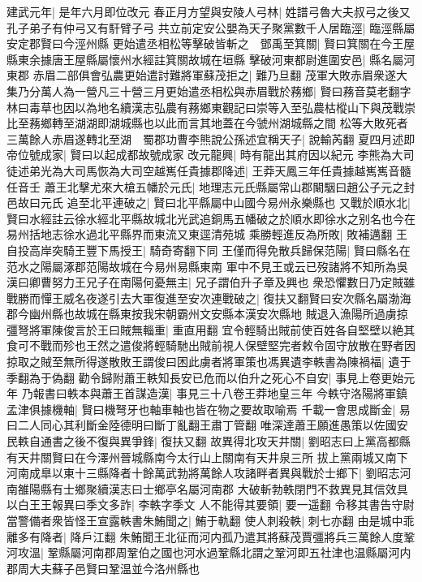 建武元年|{
	是年六月即位改元}
春正月方望與安陵人弓林|{
	姓譜弓魯大夫叔弓之後又孔子弟子有仲弓又有馯臂子弓}
共立前定安公嬰為天子聚黨數千人居臨涇|{
	臨涇縣屬安定郡賢曰今涇州縣}
更始遣丞相松等擊破皆斬之　鄧禹至箕關|{
	賢曰箕關在今王屋縣東余據唐王屋縣屬懷州水經註箕關故城在垣縣}
擊破河東都尉進圍安邑|{
	縣名屬河東郡}
赤眉二部俱會弘農更始遣討難將軍蘇茂拒之|{
	難乃旦翻}
茂軍大敗赤眉衆遂大集乃分萬人為一營凡三十營三月更始遣丞相松與赤眉戰於蓩鄉|{
	賢曰蓩音莫老翻字林曰毒草也因以為地名續漢志弘農有蓩鄉東觀記曰崇等入至弘農枯樅山下與茂戰崇比至蓩鄉轉至湖湖即湖城縣也以此而言其地蓋在今虢州湖城縣之間}
松等大敗死者三萬餘人赤眉遂轉北至湖　蜀郡功曹李熊說公孫述宜稱天子|{
	說輸芮翻}
夏四月述即帝位號成家|{
	賢曰以起成都故號成家}
改元龍興|{
	時有龍出其府因以紀元}
李熊為大司徒述弟光為大司馬恢為大司空越嶲任貴據郡降述|{
	王莽天鳳三年任貴據越嶲嶲音髓任音壬}
蕭王北擊尤來大槍五幡於元氏|{
	地理志元氏縣屬常山郡闞駰曰趙公子元之封邑故曰元氏}
追至北平連破之|{
	賢曰北平縣屬中山國今易州永樂縣也}
又戰於順水北|{
	賢曰水經註云徐水經北平縣故城北光武追銅馬五幡破之於順水即徐水之别名也今在易州括地志徐水過北平縣界而東流又東逕清苑城}
乘勝輕進反為所敗|{
	敗補邁翻}
王自投高岸突騎王豐下馬授王|{
	騎奇寄翻下同}
王僅而得免散兵歸保范陽|{
	賢曰縣名在范水之陽屬涿郡范陽故城在今易州易縣東南}
軍中不見王或云已歿諸將不知所為吳漢曰卿曹努力王兄子在南陽何憂無主|{
	兄子謂伯升子章及興也}
衆恐懼數日乃定賊雖戰勝而憚王威名夜遂引去大軍復進至安次連戰破之|{
	復扶又翻賢曰安次縣名屬渤海郡今幽州縣也故城在縣東按我宋朝霸州文安縣本漢安次縣地}
賊退入漁陽所過虜掠彊弩將軍陳俊言於王曰賊無輜重|{
	重直用翻}
宜令輕騎出賊前使百姓各自堅壁以絶其食可不戰而殄也王然之遣俊將輕騎馳出賊前視人保壁堅完者敕令固守放散在野者因掠取之賊至無所得遂散敗王謂俊曰困此虜者將軍策也馮異遺李軼書為陳禍福|{
	遺于季翻為于偽翻}
勸令歸附蕭王軼知長安已危而以伯升之死心不自安|{
	事見上卷更始元年}
乃報書曰軼本與蕭王首謀造漢|{
	事見三十八卷王莽地皇三年}
今軼守洛陽將軍鎮孟津俱據機軸|{
	賢曰機弩牙也軸車軸也皆在物之要故取喻焉}
千載一會思成斷金|{
	易曰二人同心其利斷金陸德明曰斷丁亂翻王肅丁管翻}
唯深達蕭王願進愚策以佐國安民軼自通書之後不復與異爭鋒|{
	復扶又翻}
故異得北攻天井關|{
	劉昭志曰上黨高都縣有天井關賢曰在今澤州晉城縣南今太行山上關南有天井泉三所}
拔上黨兩城又南下河南成臯以東十三縣降者十餘萬武勃將萬餘人攻諸畔者異與戰於士鄉下|{
	劉昭志河南雒陽縣有士鄉聚續漢志曰士鄉亭名屬河南郡}
大破斬勃軼閉門不救異見其信效具以白王王報異曰季文多詐|{
	李軼字季文}
人不能得其要領|{
	要一遥翻}
令移其書告守尉當警備者衆皆怪王宣露軼書朱鮪聞之|{
	鮪于軌翻}
使人刺殺軼|{
	刺七亦翻}
由是城中乖離多有降者|{
	降戶江翻}
朱鮪聞王北征而河内孤乃遣其將蘇茂賈彊將兵三萬餘人度鞏河攻溫|{
	鞏縣屬河南郡周鞏伯之國也河水過鞏縣北謂之鞏河即五社津也温縣屬河内郡周大夫蘇子邑賢曰鞏温並今洛州縣也}
